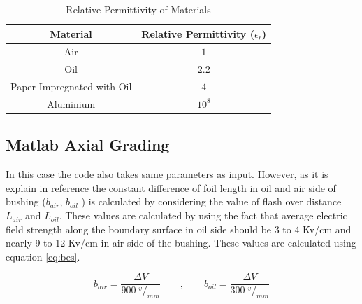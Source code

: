
\begin{table}[!htb]
\caption{Relative Permittivity of Materials}
\label{table:perm}
\begin{center}
\begin{tabular}{cc}
\toprule
\textbf{Material} & \textbf{Relative Permittivity ($\epsilon_r$)} \\ \toprule
Air & $1$ \\
Oil &$ 2.2$ \\
Paper Impregnated with Oil &$ 4$ \\
Aluminium & $10^8$\\
\bottomrule
\end{tabular}
\end{center}
\end{table}

\subsection{Matlab Axial Grading}
In this case the code also takes same parameters as input. However, as it is explain in reference \cite{David1}  the constant difference of foil length in oil and air side of bushing ($b_{air}$, $b_{oil}$ ) is calculated by considering the value of flash over distance $L_{air}$ and $L_{oil}$. These values are calculated by using the fact that average electric field strength along the boundary surface in oil side should be 3 to 4 Kv/cm and nearly 9 to 12 Kv/cm  in air side of the bushing. These values are calculated using equation \ref{eq:bes}. 
 
\begin{equation}
\label{eq:bes}
 b_{air} = \displaystyle \frac{  \Delta V}{900 \;^v/_{mm}} \qquad ,\qquad
 b_{oil} = \displaystyle \frac{  \Delta V}{300 \;^v/_{mm}}
\end{equation}

